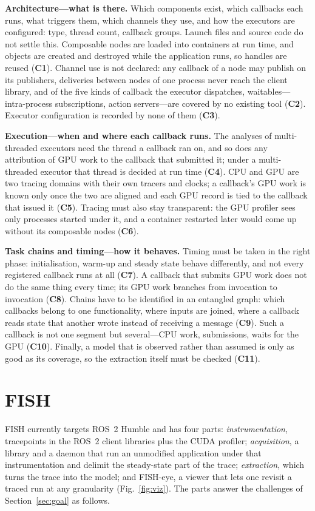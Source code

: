 \textbf{Architecture---what is there.} Which components exist, which callbacks each runs, what triggers them, which channels they use, and how the executors are configured: type, thread count, callback groups. Launch files and source code do not settle this. Composable nodes are loaded into containers at run time, and objects are created and destroyed while the application runs, so handles are reused (\textbf{C1}). Channel use is not declared: any callback of a node may publish on its publishers, deliveries between nodes of one process never reach the client library, and of the five kinds of callback the executor dispatches, waitables---intra-process subscriptions, action servers---are covered by no existing tool (\textbf{C2}). Executor configuration is recorded by none of them (\textbf{C3}).

\textbf{Execution---when and where each callback runs.} The analyses of multi-threaded executors need the thread a callback ran on, and so does any attribution of GPU work to the callback that submitted it; under a multi-threaded executor that thread is decided at run time (\textbf{C4}). CPU and GPU are two tracing domains with their own tracers and clocks; a callback's GPU work is known only once the two are aligned and each GPU record is tied to the callback that issued it (\textbf{C5}). Tracing must also stay transparent: the GPU profiler sees only processes started under it, and a container restarted later would come up without its composable nodes (\textbf{C6}).

\textbf{Task chains and timing---how it behaves.} Timing must be taken in the right phase: initialisation, warm-up and steady state behave differently, and not every registered callback runs at all (\textbf{C7}). A callback that submits GPU work does not do the same thing every time; its GPU work branches from invocation to invocation (\textbf{C8}). Chains have to be identified in an entangled graph: which callbacks belong to one functionality, where inputs are joined, where a callback reads state that another wrote instead of receiving a message (\textbf{C9}). Such a callback is not one segment but several---CPU work, submissions, waits for the GPU (\textbf{C10}). Finally, a model that is observed rather than assumed is only as good as its coverage, so the extraction itself must be checked (\textbf{C11}).

\section{FISH}
\label{sec:method}
FISH currently targets ROS~2 Humble and has four parts: \emph{instrumentation}, tracepoints in the ROS~2 client libraries plus the CUDA profiler; \emph{acquisition}, a library and a daemon that run an unmodified application under that instrumentation and delimit the steady-state part of the trace; \emph{extraction}, which turns the trace into the model; and FISH-eye, a viewer that lets one revisit a traced run at any granularity (Fig.~\ref{fig:viz}). The parts answer the challenges of Section~\ref{sec:goal} as follows.

